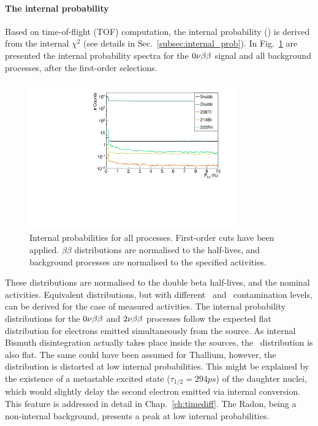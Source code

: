 \paragraph{The internal probability}
Based on time-of-flight (TOF) computation, the internal probability (\Pint) is derived from the internal $\chi^{2}$ (see details in Sec.~\ref{subsec:internal_prob}).
In Fig.~\ref{fig:Pint} are presented the internal probability spectra for the $0\nu\beta\beta$ signal and all background processes, after the first-order selections.
\begin{figure}[h!]
  \centering
  \includegraphics[width=0.8\textwidth]{Sensitivity/fig_sensitivity/InternalProbability.pdf}
  \caption{Internal probabilities for all processes.
    First-order cuts have been applied.
    $\beta\beta$ distributions are normalised to the half-lives, and background processes are normalised to the specified activities.
    \label{fig:Pint}}
\end{figure}
These distributions are normalised to the double beta half-lives, and the nominal activities.
Equivalent distributions, but with different \Bi\ and \Tl\ contamination levels, can be derived for the case of measured activities.
The internal probability distributions for the $0\nu\beta\beta$ and $2\nu\beta\beta$ processes follow the expected flat distribution for electrons emitted simultaneously from the source.
As internal Bismuth disintegration actually takes place inside the sources, the \Bi\ distribution is also flat.
The same could have been assumed for Thallium, however, the distribution is distorted at low internal probabilities.
This might be explained by the existence of a metastable excited state ($\tau_{1/2} = 294 ps$) of the daughter nuclei, which would slightly delay the second electron emitted via internal conversion.
This feature is addressed in detail in Chap.~\ref{ch:timediff}.
The Radon, being a non-internal background, presents a peak at low internal probabilities.

